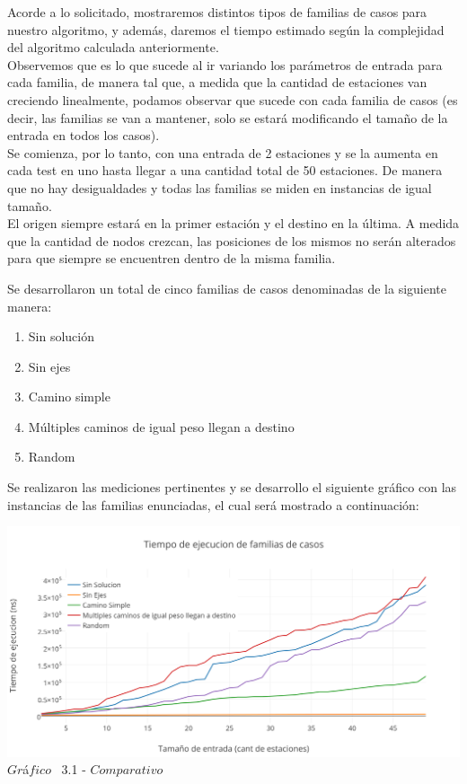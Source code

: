 \indent Acorde a lo solicitado, mostraremos distintos tipos de familias de casos para nuestro algoritmo, y adem\'as, daremos el tiempo estimado 
seg\'un la complejidad del algoritmo calculada anteriormente.\\

Observemos que es lo que sucede al ir variando los parámetros de entrada para cada familia, de manera tal que, a medida que la cantidad de estaciones van creciendo linealmente, podamos observar que sucede con cada familia de casos (es decir, las familias se van a mantener, solo se estar\'a modificando el tamaño de la entrada en todos los casos).\\

Se comienza, por lo tanto, con una entrada de 2 estaciones y se la aumenta en cada test en uno hasta llegar a una cantidad total de 50 estaciones. De manera que no hay desigualdades y todas las familias se miden en instancias de igual tamaño.\\
El origen siempre estará en la primer estaci\'on y el destino en la última. A medida que la cantidad de nodos crezcan, las posiciones de los mismos no serán alterados para que siempre se encuentren dentro de la misma familia.

Se desarrollaron un total de cinco familias de casos denominadas de la siguiente manera:\\

\begin{enumerate}
\item Sin solución
\item Sin ejes
\item Camino simple
\item Múltiples caminos de igual peso llegan a destino
\item Random
\end{enumerate}

Se realizaron las mediciones pertinentes y se desarrollo el siguiente gr\'afico con las instancias de las familias enunciadas, el cual ser\'a mostrado a continuaci\'on:

\vspace*{0.3cm} \vspace*{0.3cm}
  \begin{center}
 \includegraphics[scale=0.65]{./EJ3/comparativo.png}
 {$Gr$\'a$fico$ \ 3.1 - $Comparativo$}
  \end{center}
  \vspace*{0.3cm}

